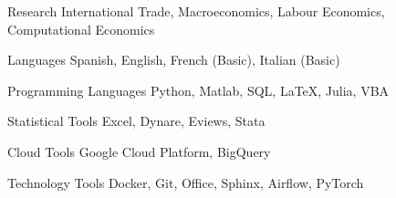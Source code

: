 

\begin{cvskills}

\cvskill
    {Research} %
    {International Trade, Macroeconomics, Labour Economics, Computational Economics} %

\cvskill
    {Languages} %
    {Spanish, English, French (Basic), Italian (Basic)} %

\cvskill
    {Programming Languages} %
    {Python, Matlab, SQL, LaTeX, Julia, VBA} %

\cvskill
    {Statistical Tools} %
    {Excel, Dynare, Eviews, Stata} %

\cvskill
    {Cloud Tools} %
    {Google Cloud Platform, BigQuery} %

\cvskill
    {Technology Tools} %
    {Docker, Git, Office, Sphinx, Airflow, PyTorch} %

\end{cvskills}

